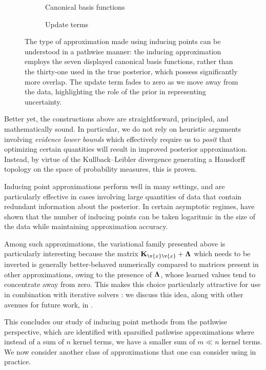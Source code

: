 \documentclass[11pt]{book}
\begin{document}
\begin{figure}
\begin{subfigure}{0.49\textwidth}

\caption{Canonical basis functions}
\end{subfigure}
\begin{subfigure}{0.49\textwidth}

\caption{Update terms}
\end{subfigure}
\caption{The type of approximation made using inducing points can be understood in a pathwise manner: the inducing approximation employs the seven displayed canonical basis functions, rather than the thirty-one used in the true posterior, which possess significantly more overlap.
The update term fades to zero as we move away from the data, highlighting the role of the prior in representing uncertainty.}
\label{fig:gp-ip}
\end{figure}

Better yet, the constructions above are straightforward, principled, and mathematically sound.
In particular, we do not rely on heuristic arguments involving \emph{evidence lower bounds} which effectively require us to \emph{posit} that optimizing certain quantities will result in improved posterior approximation.
Instead, by virtue of the Kullback--Leibler divergence generating a Hausdorff topology on the space of probability measures, this is proven.

Inducing point approximations perform well in many settings, and are particularly effective in cases involving large quantities of data that contain redundant information about the posterior.
In certain asymptotic regimes, \textcite{burt19} have shown that the number of inducing points can be taken logaritmic in the size of the data while maintaining approximation accuracy.

Among such approximations, the variational family presented above is particularly interesting because the matrix $\m{K}_{\v{x}\v{x}} + \m\Lambda$ which needs to be inverted is generally better-behaved numerically compared to matrices present in other approximations, owing to the presence of $\m\Lambda$, whose learned values tend to concentrate away from zero.
This makes this choice particularly attractive for use in combination with iterative solvers \cite{dong17,gardner18,pleiss18,meanti20,pleiss20}: we discuss this idea, along with other avenues for future work, in .

This concludes our study of inducing point methods from the pathwise perspective, which are identified with sparsified pathwise approximations where instead of a sum of $n$ kernel terms, we have a smaller sum of $m \ll n$ kernel terms.
We now consider another class of approximations that one can consider using in practice.
\end{document}
